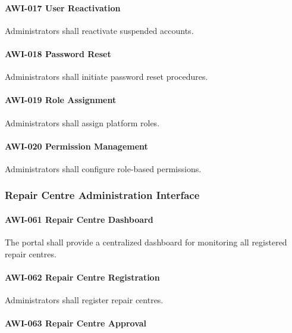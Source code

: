 \paragraph{AWI-017 User Reactivation}

Administrators shall reactivate suspended accounts.

\paragraph{AWI-018 Password Reset}

Administrators shall initiate password reset procedures.

\paragraph{AWI-019 Role Assignment}

Administrators shall assign platform roles.

\paragraph{AWI-020 Permission Management}

Administrators shall configure role-based permissions.


\subsubsection*{Repair Centre Administration Interface}

\paragraph{AWI-061 Repair Centre Dashboard}

The portal shall provide a centralized dashboard for monitoring all
registered repair centres.

\paragraph{AWI-062 Repair Centre Registration}

Administrators shall register repair centres.

\paragraph{AWI-063 Repair Centre Approval}

